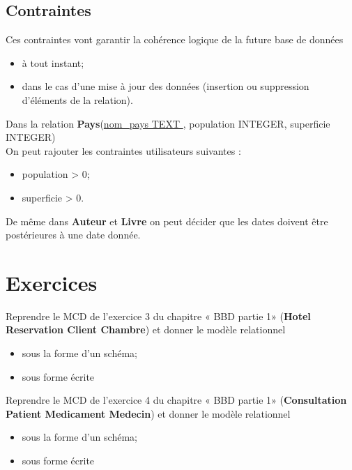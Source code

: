 \subsection{Contraintes}
Ces contraintes vont garantir la cohérence logique de la future base de données
\begin{itemize}
	\item	à tout instant;
	\item	dans le cas d'une mise à jour des données (insertion ou suppression d'éléments de la relation).
\end{itemize}

\begin{exemple}
	Dans la relation \textbf{Pays}(\uline{nom\_pays TEXT }, population INTEGER, superficie INTEGER)\\
	
	On peut rajouter les contraintes utilisateurs suivantes :
	\begin{itemize}
		\item 	population > 0;
		\item 	superficie > 0.
	\end{itemize}
	De même dans \textbf{Auteur} et \textbf{Livre} on peut décider que les dates doivent être postérieures à une date donnée.	
\end{exemple}
\section{Exercices}

\begin{exercice}[]
	Reprendre le MCD de l'exercice 3 du chapitre « BBD partie 1» (\textbf{Hotel Reservation Client Chambre}) et donner le modèle relationnel
	\begin{itemize}
		\item	sous la forme d'un schéma;
		\item	sous forme écrite
	\end{itemize}
\end{exercice}

\begin{exercice}[]
	Reprendre le MCD de l'exercice 4 du chapitre « BBD partie 1» (\textbf{Consultation Patient Medicament Medecin}) et donner le modèle relationnel
	\begin{itemize}
		\item	sous la forme d'un schéma;
		\item	sous forme écrite
	\end{itemize}
\end{exercice}

